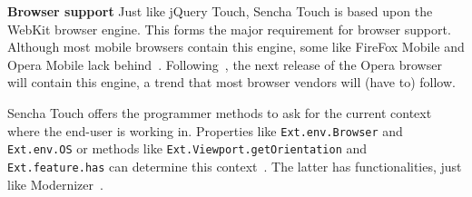 \documentclass[a4paper]{artikel3}
\newcommand{\term}[1]{\emph{#1}}
\newcommand{\code}[1]{\texttt{#1}}
\renewcommand{\paragraph}[1]{{\bf #1} }
\begin{document}

% 
% 

\paragraph{Browser support}
Just like jQuery Touch,  Sencha Touch is based upon the WebKit browser engine.  This forms the major requirement for browser support.  Although most mobile browsers contain this engine,  some like FireFox Mobile and Opera Mobile lack behind~\cite{JohnEClark2012}.  Following~\cite{Wokke2013}, the next release of the Opera browser will contain this engine,  a trend that most browser vendors will (have to) follow.

Sencha Touch offers the programmer methods to ask for the current context where the end-user is working in.  Properties like \code{Ext.env.Browser} and \code{Ext.env.OS} or methods like \code{Ext.Viewport.getOrientation} and \code{Ext.feature.has} can determine this context~\cite{JohnEClark2012}.  The latter has functionalities,  just like Modernizer~\cite{Modernizr2012}.  
\end{document}

